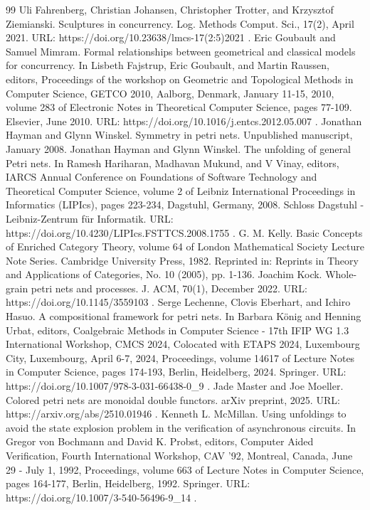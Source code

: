 \begin{thebibliography}{99}
 Uli Fahrenberg, Christian Johansen, Christopher Trotter, and Krzysztof Ziemianski. Sculptures in concurrency. Log. Methods Comput. Sci., 17(2), April 2021. URL: https://doi.org/10.23638/lmcs-17(2:5)2021 .
 Eric Goubault and Samuel Mimram. Formal relationships between geometrical and classical models for concurrency. In Lisbeth Fajstrup, Eric Goubault, and Martin Raussen, editors, Proceedings of the workshop on Geometric and Topological Methods in Computer Science, GETCO 2010, Aalborg, Denmark, January 11-15, 2010, volume 283 of Electronic Notes in Theoretical Computer Science, pages 77-109. Elsevier, June 2010. URL: https://doi.org/10.1016/j.entcs.2012.05.007 .
 Jonathan Hayman and Glynn Winskel. Symmetry in petri nets. Unpublished manuscript, January 2008.
 Jonathan Hayman and Glynn Winskel. The unfolding of general Petri nets. In Ramesh Hariharan, Madhavan Mukund, and V Vinay, editors, IARCS Annual Conference on Foundations of Software Technology and Theoretical Computer Science, volume 2 of Leibniz International Proceedings in Informatics (LIPIcs), pages 223-234, Dagstuhl, Germany, 2008. Schloss Dagstuhl - Leibniz-Zentrum für Informatik. URL: https://doi.org/10.4230/LIPIcs.FSTTCS.2008.1755 .
 G. M. Kelly. Basic Concepts of Enriched Category Theory, volume 64 of London Mathematical Society Lecture Note Series. Cambridge University Press, 1982. Reprinted in: Reprints in Theory and Applications of Categories, No. 10 (2005), pp. 1-136.
 Joachim Kock. Whole-grain petri nets and processes. J. ACM, 70(1), December 2022. URL: https://doi.org/10.1145/3559103 .
 Serge Lechenne, Clovis Eberhart, and Ichiro Hasuo. A compositional framework for petri nets. In Barbara König and Henning Urbat, editors, Coalgebraic Methods in Computer Science - 17th IFIP WG 1.3 International Workshop, CMCS 2024, Colocated with ETAPS 2024, Luxembourg City, Luxembourg, April 6-7, 2024, Proceedings, volume 14617 of Lecture Notes in Computer Science, pages 174-193, Berlin, Heidelberg, 2024. Springer. URL: https://doi.org/10.1007/978-3-031-66438-0\_9 .
 Jade Master and Joe Moeller. Colored petri nets are monoidal double functors. arXiv preprint, 2025. URL: https://arxiv.org/abs/2510.01946 .
 Kenneth L. McMillan. Using unfoldings to avoid the state explosion problem in the verification of asynchronous circuits. In Gregor von Bochmann and David K. Probst, editors, Computer Aided Verification, Fourth International Workshop, CAV '92, Montreal, Canada, June 29 - July 1, 1992, Proceedings, volume 663 of Lecture Notes in Computer Science, pages 164-177, Berlin, Heidelberg, 1992. Springer. URL: https://doi.org/10.1007/3-540-56496-9\_14 .

\end{thebibliography}

